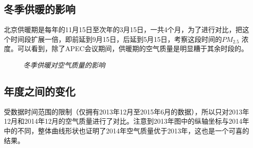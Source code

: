 ﻿\documentclass{article}
\begin{document}
\begin{CJK*}{GBK}{song}
\subsection{冬季供暖的影响}
\qquad 北京供暖期是每年的11月15日至次年的3月15日，一共4个月，为了进行对比，把这个时间段扩展一倍，即前延到9月15日，后延到5月15日，考察这段时间的$PM_{2.5}$ 浓度。可以看到，除了APEC会议期间，供暖期的空气质量是明显糟于其余时段的。

\begin{figure}[ht]
\centering
{}
\caption{\textit{冬季供暖对空气质量的影响}}
\end{figure}


\subsection{年度之间的变化}
\qquad 受数据时间范围的限制（仅拥有2013年12月至2015年6月的数据），所以只对2013年12月和2014年12月的空气质量进行了对比。注意到2013年图中的纵轴坐标与2014年中的不同，整体曲线形状也证明了2014年空气质量优于2013年，这也是一个可喜的结果。


\end{CJK*}
\end{document}

